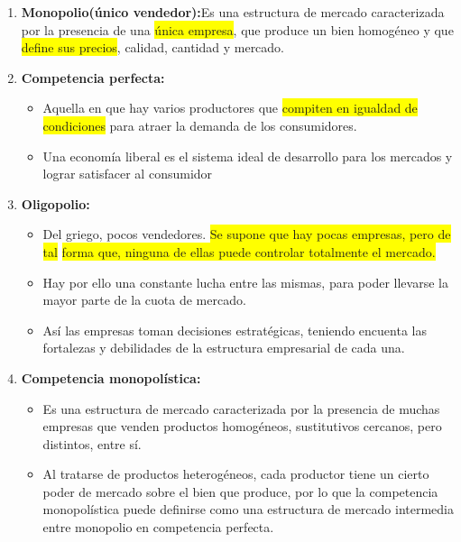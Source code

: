 \documentclass{templateNote}
\newcommand{\destacar}[1]{ \colorbox{yellow}{#1}}
\begin{document}
\begin{enumerate}
    \item \textbf{Monopolio(único vendedor):}Es una estructura de mercado
    caracterizada por la presencia de una \destacar{única empresa}, que
    produce un bien homogéneo y que \destacar{define sus precios}, calidad,
    cantidad y mercado.

    \item \textbf{Competencia perfecta:}
    \begin{itemize}
        \item Aquella en que hay varios productores que \destacar{compiten en igualdad
        de condiciones} para atraer la demanda de los consumidores.

        \item Una economía liberal es el sistema ideal de desarrollo para los
        mercados y lograr satisfacer al consumidor
    \end{itemize}

\newpage
    \item \textbf{Oligopolio:}
    \begin{itemize}
        \item Del griego, pocos vendedores. \destacar{Se supone que hay pocas
        empresas, pero de tal} \destacar{forma que, ninguna de ellas puede
        controlar totalmente el mercado.}

        \item Hay por ello una constante lucha entre las mismas, para poder
        llevarse la mayor parte de la cuota de mercado.

        \item Así las empresas toman decisiones estratégicas, teniendo
        encuenta las fortalezas y debilidades de la estructura empresarial
        de cada una.        
    \end{itemize}

    \item \textbf{Competencia monopolística:}
    \begin{itemize}
        \item Es una estructura de mercado caracterizada por la presencia de
        muchas empresas que venden productos homogéneos,
        sustitutivos cercanos, pero distintos, entre sí.

        \item Al tratarse de productos heterogéneos, cada productor tiene un
        cierto poder de mercado sobre el bien que produce, por lo que la
        competencia monopolística puede definirse como una estructura
        de mercado intermedia entre monopolio en competencia
        perfecta.
    \end{itemize}
\end{enumerate}
\end{document}
